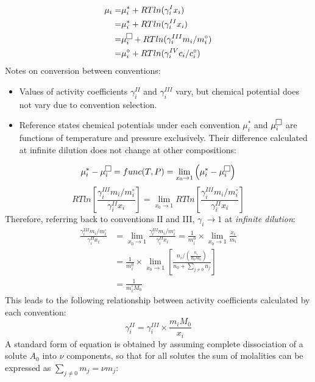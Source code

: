 \documentclass[onecolumn]{article}
\begin{document}
\begin{equation}
\begin{aligned}
\mu_i = & \mu_i^{*} + RTln(\gamma_i^{I} x_i) \\
	= 	& \mu_i^{*} + RTln(\gamma_i^{II} x_i) \\
	=	& \mu_i^{\fbox{}} + RTln(\gamma_i^{III} m_i/m_i^{\circ}) \\
	= 	& \mu_i^{\diamond} + RTln(\gamma_i^{IV} c_i/c_i^{\circ})
\end{aligned}
\end{equation}
Notes on conversion between conventions: 
\begin{itemize}
\item Values of activity coefficients $\gamma_i^{II}$ and $\gamma_i^{III}$ vary, but chemical potential does not vary due to convention selection.
\item Reference states chemical potentials under each convention $\mu_i^{*}$ and $\mu_i^{\fbox{}}$  are functions of temperature and pressure exclusively. Their difference calculated at infinite dilution does not change at other compositions:
\end{itemize}
\[
\mu_i^{*} - \mu_i^{\fbox{}}  =  func(T,P) =  \lim_{x_0 \to 1} \left( \mu_i^{*} - \mu_i^{\fbox{}}\right) 
\]
\[
RTln\left[ \frac{\gamma_i^{III} m_i/m_i^{\circ}}{\gamma_i^{II} x_i}\right] = \lim_{x_0 \to 1} RTln\left[ \frac{\gamma_i^{III} m_i/m_i^{\circ}}{\gamma_i^{II} x_i}\right] 
\]
Therefore, referring back to conventions II and III, $\gamma_i \rightarrow 1$ at \textit{infinite dilution}:
\[
\begin{aligned}
\frac{\gamma_i^{III} m_i/m_i^{\circ}}{\gamma_i^{II} x_i} & = \lim_{x_0 \to 1} \frac{\gamma_i^{III} m_i/m_i^{\circ}}{\gamma_i^{II} x_i} = \frac{1}{m_i^0} \times \lim_{x_0 \to 1} \frac{x_i}{m_i} \\
& = \frac{1}{m_i^0} \times \lim_{x_0 \to 1} \left[ \frac{n_i/ \left(\frac{n_i}{n_0 M_0}\right)}{n_0+\sum_{j \neq 0}n_j} \right] \\
& = \frac{1}{m_i^\circ M_0}
\end{aligned}
\]
This leads to the following relationship between activity coefficients calculated by each convention:
\begin{equation}
\gamma_i^{II} = \gamma_i^{III} \times \frac{m_i M_0}{x_i}
\end{equation}
A standard form of equation is obtained by assuming complete dissociation of a solute $A_0$ into $\nu$ components, so that for all solutes the sum of molalities can be expressed as $\sum_{j \neq 0}m_j = \nu m_j $:
\end{document}
